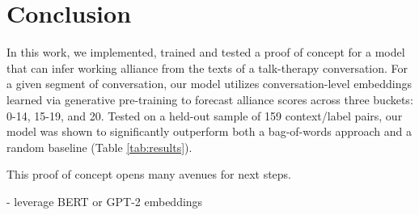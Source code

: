 \documentclass{article}
\begin{document}
\section{Conclusion}

In this work, we implemented, trained and tested a proof of concept for a model that can infer working alliance from the texts of a talk-therapy conversation. For a given segment of conversation, our model utilizes conversation-level embeddings learned via generative pre-training to forecast alliance scores across three buckets: 0-14, 15-19, and 20. Tested on a held-out sample of 159 context/label pairs, our model was shown to significantly outperform both a bag-of-words approach and a random baseline (Table \ref{tab:results}).

This proof of concept opens many avenues for next steps. 

- leverage BERT or GPT-2 embeddings








\end{document}
